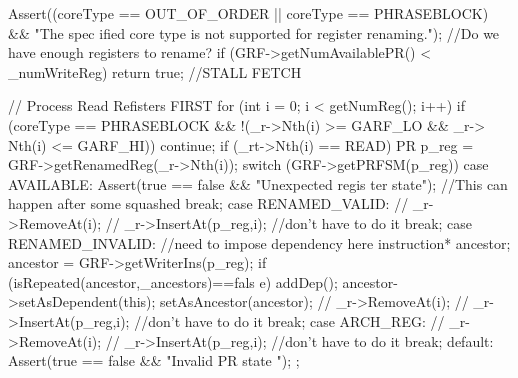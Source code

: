 \begin{DoxyCode}
                                                              {
        Assert((coreType == OUT_OF_ORDER || coreType == PHRASEBLOCK) && "The spec
      ified core type is not supported for register renaming.");
        //Do we have enough registers to rename?
        if (GRF->getNumAvailablePR() < _numWriteReg)
                return true; //STALL FETCH

        // Process Read Refisters FIRST
        for (int i = 0; i < getNumReg(); i++) {
                if (coreType == PHRASEBLOCK && !(_r->Nth(i) >= GARF_LO && _r->
      Nth(i) <= GARF_HI)) continue;
                if (_rt->Nth(i) == READ) {
                        PR p_reg = GRF->getRenamedReg(_r->Nth(i));
                        switch (GRF->getPRFSM(p_reg)) {
                                case AVAILABLE:
                                        Assert(true == false && "Unexpected regis
      ter state");
                                        //This can happen after some squashed
                                        break;
                                case RENAMED_VALID:
                                        // _r->RemoveAt(i);
                                        // _r->InsertAt(p_reg,i); //don't have to
       do it
                                        break;
                                case RENAMED_INVALID:
                                        //need to impose dependency here
                                        instruction* ancestor;
                                        ancestor = GRF->getWriterIns(p_reg);
                                        if (isRepeated(ancestor,_ancestors)==fals
      e) {
                                                addDep();
                                                ancestor->setAsDependent(this);
                                                setAsAncestor(ancestor);
                                        }
                                        // _r->RemoveAt(i);
                                        // _r->InsertAt(p_reg,i); //don't have to
       do it
                                        break;
                                case ARCH_REG:
                                        // _r->RemoveAt(i);
                                        // _r->InsertAt(p_reg,i); //don't have to
       do it
                                        break;
                                default:
                                        Assert(true == false && "Invalid PR state
      ");
                        };
                }
        }
}
\end{DoxyCode}
